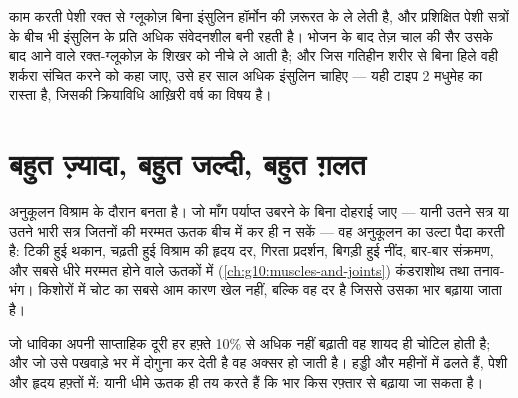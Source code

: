 \begin{example}[रक्त-शर्करा और पेशी]\label{ex:g10:sport-and-health:sugar}
काम करती पेशी रक्त से ग्लूकोज़ बिना इंसुलिन हॉर्मोन की ज़रूरत के ले लेती
है, और प्रशिक्षित पेशी सत्रों के बीच भी इंसुलिन के प्रति अधिक संवेदनशील
बनी रहती है। भोजन के बाद तेज़ चाल की सैर उसके बाद आने वाले रक्त-ग्लूकोज़ के
शिखर को नीचे ले आती है; और जिस गतिहीन शरीर से बिना हिले वही शर्करा संचित
करने को कहा जाए, उसे हर साल अधिक इंसुलिन चाहिए --- यही टाइप 2 मधुमेह का
रास्ता है, जिसकी क्रियाविधि आख़िरी वर्ष का विषय है।
\end{example}

\section{बहुत ज़्यादा, बहुत जल्दी, बहुत ग़लत}

\begin{proposition}[अति-प्रशिक्षण और चोट]\label{prop:g10:sport-and-health:overtraining}
अनुकूलन विश्राम के दौरान बनता है। जो माँग पर्याप्त उबरने के बिना दोहराई
जाए --- यानी उतने सत्र या उतने भारी सत्र जितनों की मरम्मत ऊतक बीच में कर
ही न सकें --- वह अनुकूलन का उल्टा पैदा करती है: टिकी हुई थकान, चढ़ती हुई
विश्राम की हृदय दर, गिरता प्रदर्शन, बिगड़ी हुई नींद, बार-बार संक्रमण,
और सबसे धीरे मरम्मत होने वाले ऊतकों में
(\cref{ch:g10:muscles-and-joints}) कंडराशोथ तथा तनाव-भंग। किशोरों में चोट
का सबसे आम कारण खेल नहीं, बल्कि वह दर है जिससे उसका भार बढ़ाया जाता है।
\end{proposition}
\admitted

\begin{example}[दस प्रतिशत का नियम]\label{ex:g10:sport-and-health:tenpercent}
जो धाविका अपनी साप्ताहिक दूरी हर हफ़्ते 10\% से अधिक नहीं बढ़ाती वह शायद
ही चोटिल होती है; और जो उसे पखवाड़े भर में दोगुना कर देती है वह अक्सर हो
जाती है। हड्डी और  महीनों में ढलते हैं, पेशी और हृदय हफ़्तों में:
यानी धीमे ऊतक ही तय करते हैं कि भार किस रफ़्तार से बढ़ाया जा सकता है।
\end{example}

